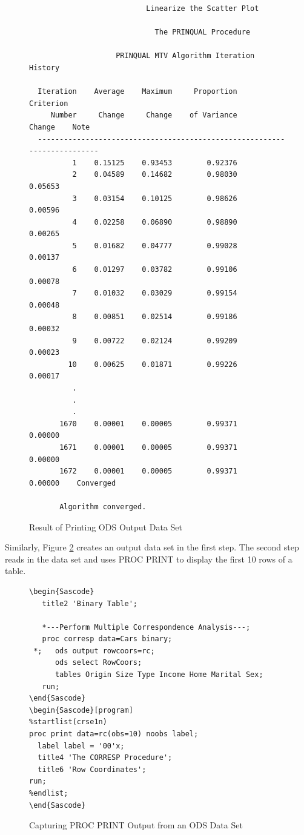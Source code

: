 \documentclass[article,oneside]{memoir}
\begin{document}
\begin{figure}[H]
\footnotesize
\begin{snugshade}
\begin{verbatim}
                           Linearize the Scatter Plot

                             The PRINQUAL Procedure

                    PRINQUAL MTV Algorithm Iteration History

  Iteration    Average    Maximum     Proportion    Criterion
     Number     Change     Change    of Variance       Change    Note
  -------------------------------------------------------------------------
          1    0.15125    0.93453        0.92376
          2    0.04589    0.14682        0.98030      0.05653
          3    0.03154    0.10125        0.98626      0.00596
          4    0.02258    0.06890        0.98890      0.00265
          5    0.01682    0.04777        0.99028      0.00137
          6    0.01297    0.03782        0.99106      0.00078
          7    0.01032    0.03029        0.99154      0.00048
          8    0.00851    0.02514        0.99186      0.00032
          9    0.00722    0.02124        0.99209      0.00023
         10    0.00625    0.01871        0.99226      0.00017
          .
          .
          .
       1670    0.00001    0.00005        0.99371      0.00000
       1671    0.00001    0.00005        0.99371      0.00000
       1672    0.00001    0.00005        0.99371      0.00000    Converged

       Algorithm converged.
\end{verbatim}
\end{snugshade}
\caption{Result of Printing ODS Output Data Set}\label{odsmanipresult}
\end{figure}


  Similarly, Figure \ref{printods} creates an output data set in the first step.
  The second step reads in the data set and uses PROC PRINT to display
  the first 10 rows of a table.

\begin{figure}[H]
\begin{snugshade}
\begin{verbatim}
\begin{Sascode}
   title2 'Binary Table';

   *---Perform Multiple Correspondence Analysis---;
   proc corresp data=Cars binary;
 *;   ods output rowcoors=rc;
      ods select RowCoors;
      tables Origin Size Type Income Home Marital Sex;
   run;
\end{Sascode}
\begin{Sascode}[program]
%startlist(crse1n)
proc print data=rc(obs=10) noobs label;
  label label = '00'x;
  title4 'The CORRESP Procedure';
  title6 'Row Coordinates';
run;
%endlist;
\end{Sascode}
\end{verbatim}
\end{snugshade}
\caption{Capturing PROC PRINT Output from an ODS Data Set}\label{printods}
\end{figure}
\end{document}
